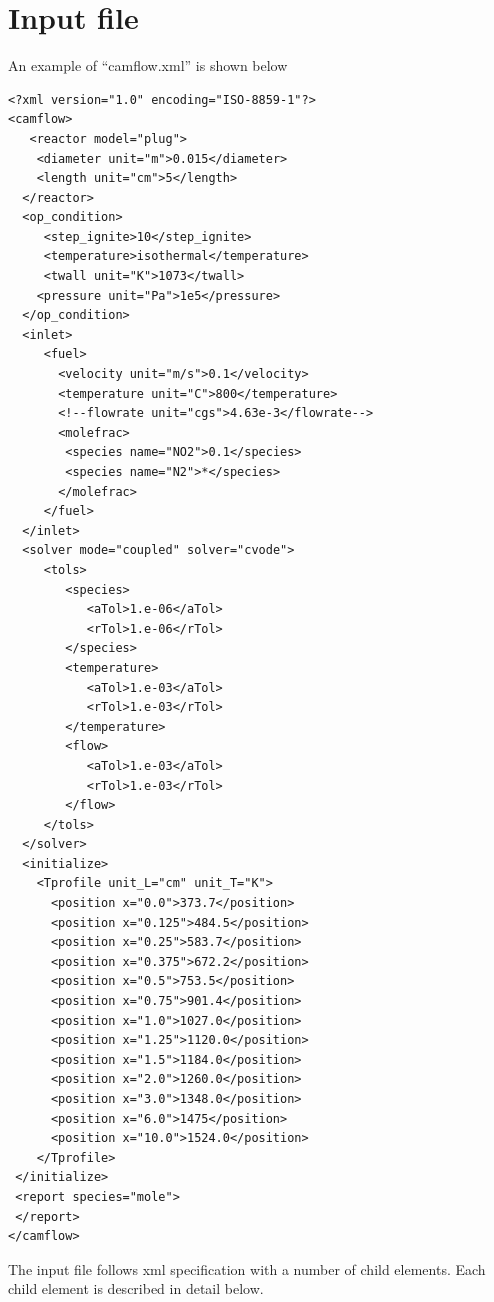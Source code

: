 \section{Input file}
An example of ``camflow.xml'' is shown below
{\scriptsize{\begin{verbatim}
<?xml version="1.0" encoding="ISO-8859-1"?>
<camflow>
   <reactor model="plug">
    <diameter unit="m">0.015</diameter>
    <length unit="cm">5</length>
  </reactor>
  <op_condition>
     <step_ignite>10</step_ignite>
     <temperature>isothermal</temperature>
     <twall unit="K">1073</twall>
    <pressure unit="Pa">1e5</pressure>
  </op_condition>
  <inlet>
     <fuel>
       <velocity unit="m/s">0.1</velocity>
       <temperature unit="C">800</temperature>
       <!--flowrate unit="cgs">4.63e-3</flowrate-->
       <molefrac>
        <species name="NO2">0.1</species>
        <species name="N2">*</species>
       </molefrac>
     </fuel>
  </inlet>
  <solver mode="coupled" solver="cvode">
     <tols>
        <species>
           <aTol>1.e-06</aTol>
           <rTol>1.e-06</rTol>
        </species>
        <temperature>
           <aTol>1.e-03</aTol>
           <rTol>1.e-03</rTol>
        </temperature>
        <flow>
           <aTol>1.e-03</aTol>
           <rTol>1.e-03</rTol>
        </flow>
     </tols>
  </solver>
  <initialize>    
    <Tprofile unit_L="cm" unit_T="K">
      <position x="0.0">373.7</position>
      <position x="0.125">484.5</position>
      <position x="0.25">583.7</position>
      <position x="0.375">672.2</position>
      <position x="0.5">753.5</position>
      <position x="0.75">901.4</position>
      <position x="1.0">1027.0</position>
      <position x="1.25">1120.0</position>
      <position x="1.5">1184.0</position>
      <position x="2.0">1260.0</position>
      <position x="3.0">1348.0</position>
      <position x="6.0">1475</position>
      <position x="10.0">1524.0</position>
    </Tprofile>
 </initialize>
 <report species="mole">
 </report>
</camflow>

\end{verbatim}}

}

The input file follows xml specification with a number of child elements. Each child element is described in detail below.

